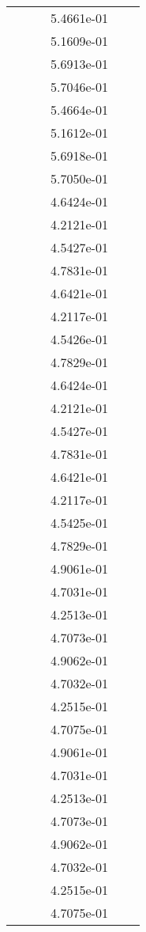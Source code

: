 \begin{xltabular}{\textwidth}{r|rS[table-format=1.3e+2]S[table-format=1.4e+2]S[table-format=1.4e+2]S[table-format=-1.5]}
&  &  & 5.4661e-01 & & \\
&  &  & 5.1609e-01 & & \\
&  &  & 5.6913e-01 & & \\
&  &  & 5.7046e-01 & & \\
&  &  & 5.4664e-01 & & \\
&  &  & 5.1612e-01 & & \\
&  &  & 5.6918e-01 & & \\
&  &  & 5.7050e-01 & & \\
&  &  & 4.6424e-01 & & \\
&  &  & 4.2121e-01 & & \\
&  &  & 4.5427e-01 & & \\
&  &  & 4.7831e-01 & & \\
&  &  & 4.6421e-01 & & \\
&  &  & 4.2117e-01 & & \\
&  &  & 4.5426e-01 & & \\
&  &  & 4.7829e-01 & & \\
&  &  & 4.6424e-01 & & \\
&  &  & 4.2121e-01 & & \\
&  &  & 4.5427e-01 & & \\
&  &  & 4.7831e-01 & & \\
&  &  & 4.6421e-01 & & \\
&  &  & 4.2117e-01 & & \\
&  &  & 4.5425e-01 & & \\
&  &  & 4.7829e-01 & & \\
&  &  & 4.9061e-01 & & \\
&  &  & 4.7031e-01 & & \\
&  &  & 4.2513e-01 & & \\
&  &  & 4.7073e-01 & & \\
&  &  & 4.9062e-01 & & \\
&  &  & 4.7032e-01 & & \\
&  &  & 4.2515e-01 & & \\
&  &  & 4.7075e-01 & & \\
&  &  & 4.9061e-01 & & \\
&  &  & 4.7031e-01 & & \\
&  &  & 4.2513e-01 & & \\
&  &  & 4.7073e-01 & & \\
&  &  & 4.9062e-01 & & \\
&  &  & 4.7032e-01 & & \\
&  &  & 4.2515e-01 & & \\
&  &  & 4.7075e-01 & & \\

\end{xltabular}
